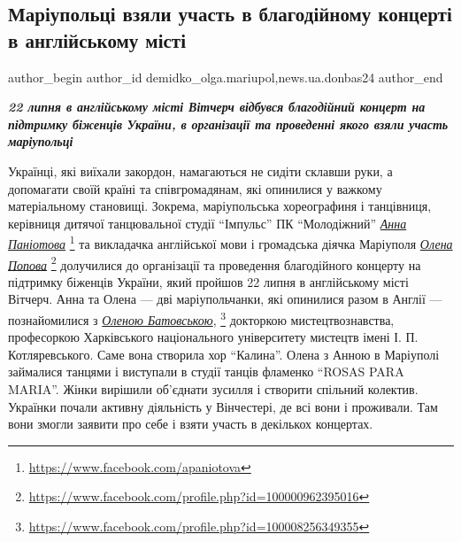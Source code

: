  
 
 
 
 
 
\subsection{Маріупольці взяли участь в благодійному концерті в англійському місті}
\label{sec:23_07_2022.stz.news.ua.donbas24.1.mrplci_uchast_blagodijn_koncert_v_angl_misti}
 
\ifcmt
 author_begin
   author_id demidko_olga.mariupol,news.ua.donbas24
 author_end
\fi


\begin{center}
  \em\color{blue}\bfseries\Large
22 липня в англійському місті Вітчерч відбувся благодійний концерт на
підтримку біженців України, в організації та проведенні якого взяли
участь маріупольці
\end{center}

Українці, які виїхали закордон, намагаються не сидіти склавши руки, а
допомагати своїй країні та співгромадянам, які опинилися у важкому
матеріальному становищі. Зокрема, маріупольська хореографиня і танцівниця,
керівниця дитячої танцювальної студії \enquote{Імпульс} ПК \enquote{Молодіжний} \href{https://www.facebook.com/apaniotova}{\emph{Анна Паніотова}}%
\footnote{\url{https://www.facebook.com/apaniotova}}
та викладачка англійської мови і громадська діячка Маріуполя \href{https://www.facebook.com/profile.php?id=100000962395016}{\emph{Олена Попова}}%
\footnote{\url{https://www.facebook.com/profile.php?id=100000962395016}}
долучилися до організації та проведення благодійного концерту на підтримку
біженців України, який пройшов 22 липня в англійському місті Вітчерч. Анна та
Олена — дві маріупольчанки, які опинилися разом в Англії — познайомилися з
\href{https://www.facebook.com/profile.php?id=100008256349355}{\emph{Оленою Батовською}},%
\footnote{\url{https://www.facebook.com/profile.php?id=100008256349355}} докторкою мистецтвознавства, професоркою Харківського
національного університету мистецтв імені І. П. Котляревського. Саме вона
створила хор \enquote{Калина}. Олена з Анною в Маріуполі займалися танцями і виступали
в студії танців фламенко \enquote{ROSAS PARA MARIA}. Жінки вирішили об'єднати зусилля і
створити спільний колектив. Українки почали активну діяльність у Вінчестері, де
всі вони і проживали. Там вони змогли заявити про себе і взяти участь в
декількох концертах.

